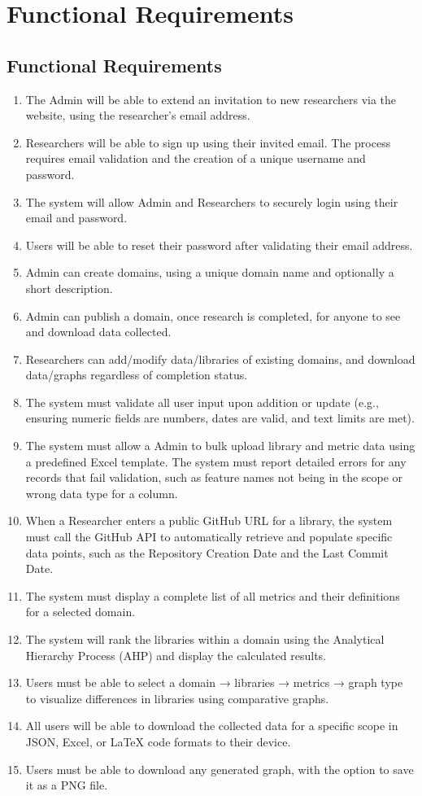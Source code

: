 \documentclass[12pt]{article}
\begin{document}
\section{Functional Requirements}
\subsection{Functional Requirements}
\begin{enumerate}[label=FR\arabic*]
  \item The Admin will be able to extend an invitation to new researchers via the website, using the researcher's email address.
  \item Researchers will be able to sign up using their invited email. The process requires email validation and the creation of a unique username and password.
  \item The system will allow Admin and Researchers to securely login using their email and password.
  \item Users will be able to reset their password after validating their email address.
  \item Admin can create domains, using a unique domain name and optionally a short description.
  \item Admin can publish a domain, once research is completed, for anyone to see and download data collected.
  \item Researchers can add/modify data/libraries of existing domains, and download data/graphs regardless of completion status.
  \item The system must validate all user input upon addition or update (e.g., ensuring numeric fields are numbers, dates are valid, and text limits are met).	
  \item The system must allow a Admin to bulk upload library and metric data using a predefined Excel template. The system must report detailed errors for any records that fail validation, such as feature names not being in the scope or wrong data type for a column.
  \item When a Researcher enters a public GitHub URL for a library, the system must call the GitHub API to automatically retrieve and populate specific data points, such as the Repository Creation Date and the Last Commit Date.
  \item The system must display a complete list of all metrics and their definitions for a selected domain.
  \item The system will rank the libraries within a domain using the Analytical Hierarchy Process (AHP) and display the calculated results.
  \item Users must be able to select a domain → libraries → metrics → graph type to visualize differences in libraries using comparative graphs.
  \item All users will be able to download the collected data for a specific scope in JSON, Excel, or LaTeX code formats to their device.
  \item Users must be able to download any generated graph, with the option to save it as a PNG file.
\end{enumerate}
\end{document}
